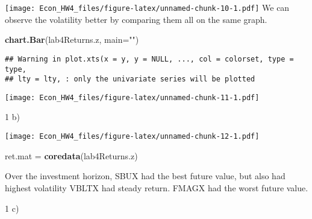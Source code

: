 \documentclass[]{article}
\newenvironment{Shaded}{\begin{snugshade}}{\end{snugshade}}
\newcommand{\KeywordTok}[1]{\textcolor[rgb]{0.13,0.29,0.53}{\textbf{#1}}}
\newcommand{\DataTypeTok}[1]{\textcolor[rgb]{0.13,0.29,0.53}{#1}}
\newcommand{\DecValTok}[1]{\textcolor[rgb]{0.00,0.00,0.81}{#1}}
\newcommand{\StringTok}[1]{\textcolor[rgb]{0.31,0.60,0.02}{#1}}
\newcommand{\OtherTok}[1]{\textcolor[rgb]{0.56,0.35,0.01}{#1}}
\newcommand{\OperatorTok}[1]{\textcolor[rgb]{0.81,0.36,0.00}{\textbf{#1}}}
\newcommand{\NormalTok}[1]{#1}
\begin{document}
\texttt{[image: Econ\_HW4\_files/figure-latex/unnamed-chunk-10-1.pdf]} We
can observe the volatility better by comparing them all on the same
graph.

\begin{Shaded}
\begin{Highlighting}[]
\KeywordTok{chart.Bar}\NormalTok{(lab4Returns.z, }\DataTypeTok{main=}\StringTok{""}\NormalTok{)}
\end{Highlighting}
\end{Shaded}

\begin{verbatim}
## Warning in plot.xts(x = y, y = NULL, ..., col = colorset, type = type,
## lty = lty, : only the univariate series will be plotted
\end{verbatim}

\texttt{[image: Econ\_HW4\_files/figure-latex/unnamed-chunk-11-1.pdf]}

1 b)

\begin{Shaded}
\end{Shaded}

\texttt{[image: Econ\_HW4\_files/figure-latex/unnamed-chunk-12-1.pdf]}

\begin{Shaded}
\begin{Highlighting}[]
\NormalTok{ret.mat =}\StringTok{ }\KeywordTok{coredata}\NormalTok{(lab4Returns.z)}
\end{Highlighting}
\end{Shaded}

Over the investment horizon, SBUX had the best future value, but also
had highest volatility VBLTX had steady return. FMAGX had the worst
future value.

1 c)
\end{document}
